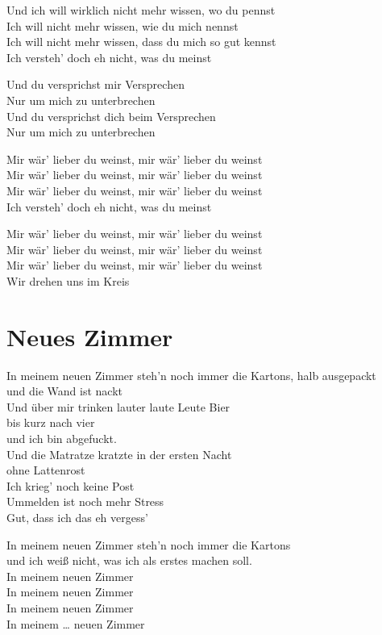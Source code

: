\documentclass[]{book}
\begin{document}
Und ich will wirklich nicht mehr wissen, wo du pennst\\
Ich will nicht mehr wissen, wie du mich nennst\\
Ich will nicht mehr wissen, dass du mich so gut kennst\\
Ich versteh' doch eh nicht, was du meinst

Und du versprichst mir Versprechen\\
Nur um mich zu unterbrechen\\
Und du versprichst dich beim Versprechen\\
Nur um mich zu unterbrechen

Mir wär' lieber du weinst, mir wär' lieber du weinst\\
Mir wär' lieber du weinst, mir wär' lieber du weinst\\
Mir wär' lieber du weinst, mir wär' lieber du weinst\\
Ich versteh' doch eh nicht, was du meinst

Mir wär' lieber du weinst, mir wär' lieber du weinst\\
Mir wär' lieber du weinst, mir wär' lieber du weinst\\
Mir wär' lieber du weinst, mir wär' lieber du weinst\\
Wir drehen uns im Kreis

\hypertarget{neues-zimmer-1}{%
\section{Neues Zimmer}\label{neues-zimmer-1}}

In meinem neuen Zimmer steh'n noch immer die Kartons, halb ausgepackt\\
und die Wand ist nackt\\
Und über mir trinken lauter laute Leute Bier\\
bis kurz nach vier\\
und ich bin abgefuckt.\\
Und die Matratze kratzte in der ersten Nacht\\
ohne Lattenrost\\
Ich krieg' noch keine Post\\
Ummelden ist noch mehr Stress\\
Gut, dass ich das eh vergess'

In meinem neuen Zimmer steh'n noch immer die Kartons\\
und ich weiß nicht, was ich als erstes machen soll.\\
In meinem neuen Zimmer\\
In meinem neuen Zimmer\\
In meinem neuen Zimmer\\
In meinem \ldots{} neuen Zimmer
\end{document}
